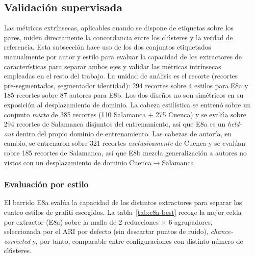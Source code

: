 \subsection{Validación supervisada}
\label{subsec:res-supervisada}
Las métricas extrínsecas, aplicables cuando se dispone de etiquetas sobre los
pares, miden directamente la concordancia entre los clústeres y la verdad de
referencia. Esta subsección hace uso de los dos conjuntos etiquetados
manualmente por autor y estilo para evaluar la capacidad de los extractores de
características para separar ambos ejes y validar las métricas intrínsecas
empleadas en el resto del trabajo. La unidad de análisis es el recorte
(recortes pre-segmentados, segmentador identidad): 294 recortes sobre 4 estilos
para E8a y 185 recortes sobre 87 autores para E8b. Los dos diseños no son
simétricos en su exposición al desplazamiento de dominio. La cabeza estilística
se entrenó sobre un conjunto \emph{mixto} de 385 recortes (110 Salamanca + 275
Cuenca) y se evalúa sobre 294 recortes de Salamanca disjuntos del
entrenamiento, así que E8a es un \textit{held-out} dentro del propio dominio de
entrenamiento. Las cabezas de autoría, en cambio, se entrenaron sobre 321
recortes \emph{exclusivamente} de Cuenca y se evalúan sobre 185 recortes de
Salamanca, así que E8b mezcla generalización a autores no vistos con un
desplazamiento de dominio Cuenca$\to$Salamanca.

\subsubsection{Evaluación por estilo}
\label{subsubsec:res-estilo}
El barrido E8a evalúa la capacidad de los distintos extractores para separar
los cuatro estilos de grafiti escogidos. La tabla~\ref{tab:e8a-best} recoge la
mejor celda por extractor (E8a) sobre la malla de $2$ reducciones $\times$ $6$
agrupadores, seleccionada por el ARI por defecto (sin descartar puntos de
ruido), \emph{chance-corrected} y, por tanto, comparable entre configuraciones
con distinto número de clústeres.

